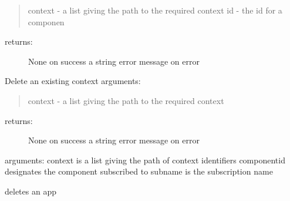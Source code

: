 \documentclass[letterpaper,10pt,english]{sphinxmanual}
\begin{document}
\begin{fulllineitems}
\begin{fulllineitems}
\begin{quote}
context - a list giving the path to the required context
id - the id for a componen
\end{quote}
\begin{description}
\item[{returns:}] \leavevmode
None on success
a string error message on error

\end{description}

\end{fulllineitems}


\begin{fulllineitems}
\label{API:personis.client.Access.delcontext}
Delete an existing context
arguments:
\begin{quote}

context - a list giving the path to the required context
\end{quote}
\begin{description}
\item[{returns:}] \leavevmode
None on success
a string error message on error

\end{description}

\end{fulllineitems}


\begin{fulllineitems}
\label{API:personis.client.Access.delete_sub}
arguments:
context is a list giving the path of context identifiers
componentid designates the component subscribed to
subname is the subscription name

\end{fulllineitems}


\begin{fulllineitems}
\label{API:personis.client.Access.deleteapp}
deletes an app

\end{fulllineitems}



\end{fulllineitems}
\end{document}
